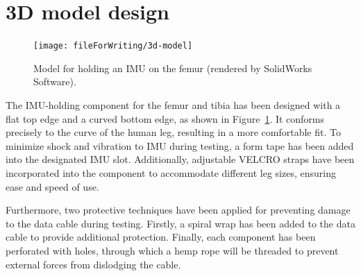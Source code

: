 \section{3D model design}

\begin{figure}[htbp]
	\centering
	\texttt{[image: 
		fileForWriting/3d-model]}
	\caption[Model for holding an IMU on the femur]{Model for holding an IMU on the femur (rendered by SolidWorks Software).}
	\label{fig:3d-model}
\end{figure}


The IMU-holding component for the femur and tibia has been designed with a flat top edge and a curved bottom edge, as shown in Figure~\ref{fig:3d-model}.
It conforms precisely to the curve of the human leg, resulting in a more comfortable fit.
To minimize shock and vibration to IMU during testing, a form tape has been added into the designated IMU slot.
Additionally, adjustable VELCRO straps have been incorporated into the component to accommodate different leg sizes, ensuring ease and speed of use.

Furthermore, two protective techniques have been applied for preventing damage to the data cable during testing.
Firstly, a spiral wrap has been added to the data cable to provide additional protection.
Finally, each component has been perforated with holes, through which a hemp rope will be threaded to prevent external forces from dislodging the cable.
